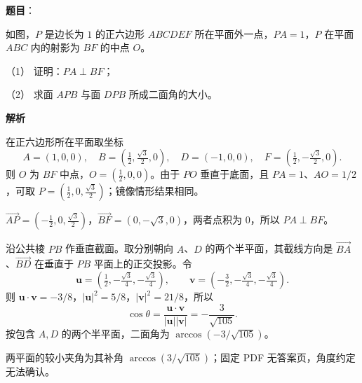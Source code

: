 \begin{answer}

\textbf{题目}：

如图，$P$ 是边长为 $1$ 的正六边形 $ABCDEF$ 所在平面外一点，$PA=1$，$P$ 在平面 $ABC$ 内的射影为 $BF$ 的中点 $O$。

（1） 证明：$PA\perp BF$；

（2） 求面 $APB$ 与面 $DPB$ 所成二面角的大小。
\nopagebreak[4]
\begin{center}\end{center}
\nopagebreak[4]
\textbf{解析}

在正六边形所在平面取坐标
\nopagebreak[4]
\[
A=(1,0,0),\quad B=(\tfrac12,\tfrac{\sqrt3}{2},0),\quad
D=(-1,0,0),\quad F=(\tfrac12,-\tfrac{\sqrt3}{2},0).
\]
则 $O$ 为 $BF$ 中点，$O=(\tfrac12,0,0)$。由于 $PO$ 垂直于底面，且 $PA=1$、$AO=1/2$，可取 $P=(\tfrac12,0,\tfrac{\sqrt3}{2})$；镜像情形结果相同。


$\overrightarrow{AP}=(-\tfrac12,0,\tfrac{\sqrt3}{2})$，$\overrightarrow{BF}=(0,-\sqrt3,0)$，两者点积为 $0$，所以 $PA\perp BF$。


沿公共棱 $PB$ 作垂直截面。取分别朝向 $A$、$D$ 的两个半平面，其截线方向是 $\overrightarrow{BA}$、$\overrightarrow{BD}$ 在垂直于 $PB$ 平面上的正交投影。令
\nopagebreak[4]
\[
\mathbf u=(\tfrac12,-\tfrac{\sqrt3}{4},-\tfrac{\sqrt3}{4}),\qquad
\mathbf v=(-\tfrac32,-\tfrac{\sqrt3}{4},-\tfrac{\sqrt3}{4}).
\]
则 $\mathbf u\cdot\mathbf v=-3/8$，$|\mathbf u|^2=5/8$，$|\mathbf v|^2=21/8$，所以
\nopagebreak[4]
\[
\cos\theta=\frac{\mathbf u\cdot\mathbf v}{|\mathbf u||\mathbf v|}
=-\frac3{\sqrt{105}}.
\]
按包含 $A,D$ 的两个半平面，二面角为 $\arccos(-3/\sqrt{105})$。

两平面的较小夹角为其补角 $\arccos(3/\sqrt{105})$；固定 PDF 无答案页，角度约定无法确认。



\end{answer}
